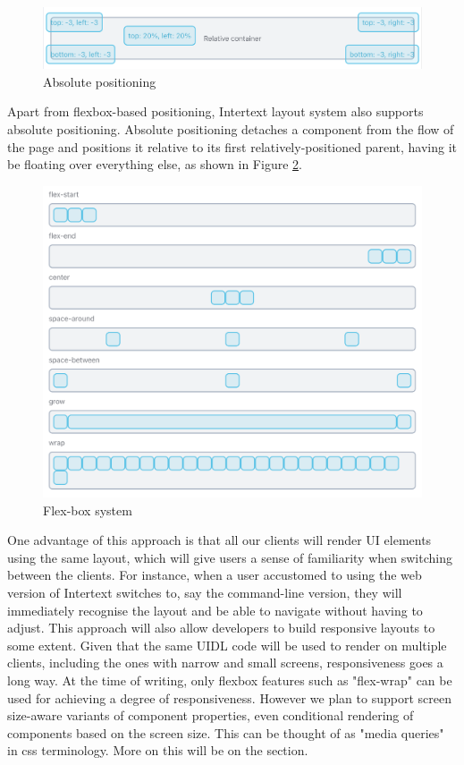 \begin{figure}[H]
  \centering
  \includegraphics[width=13cm]{thesis/paper/images/absolute.png}
  \caption{Absolute positioning}%
  \label{fig:flexbox_props}%
\end{figure}

Apart from flexbox-based positioning, Intertext layout system also supports absolute positioning. Absolute positioning detaches a component from the flow of the page and positions it relative to its first relatively-positioned parent, having it be floating over everything else, as shown in Figure \ref{fig:absolute_positioning}.

\begin{figure}
  \centering
  \includegraphics[width=13cm]{thesis/paper/images/responsive.png}
  \caption{Flex-box system}%
  \label{fig:absolute_positioning}%
\end{figure}

One advantage of this approach is that all our clients will render UI elements using the same layout, which will give users a sense of familiarity when switching between the clients. For instance, when a user accustomed to using the web version of Intertext switches to, say the command-line version, they will immediately recognise the layout and be able to navigate without having to adjust. This approach will also allow developers to build responsive layouts to some extent. Given that the same UIDL code will be used to render on multiple clients, including the ones with narrow and small screens, responsiveness goes a long way. At the time of writing, only flexbox features such as "flex-wrap" can be used for achieving a degree of responsiveness. However we plan to support screen size-aware variants of component properties, even conditional rendering of components based on the screen size. This can be thought of as "media queries" in css terminology. More on this will be on the  section.

